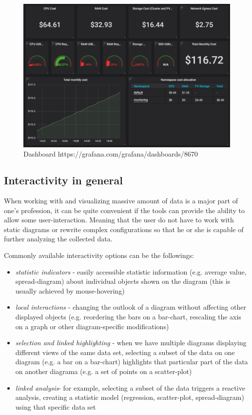 \begin{figure}[H]
	\centering
	\includegraphics[width=130mm, keepaspectratio]{figures/dashboard-small.png}
	\caption{Dashboard https://grafana.com/grafana/dashboards/8670}
	\label{fig:dashboard}
\end{figure}

\subsection{Interactivity in general}
When working with and visualizing massive amount of data is a major part of one's profession, it can be quite convenient if the tools can provide the ability to allow some user-interaction. Meaning that the user do not have to work with static diagrams or rewrite complex configurations so that he or she is capable of further analyzing the collected data.

Commonly available interactivity options can be the followings:
\begin{itemize}
	\item \emph{statistic indicators} - easily accessible statistic information (e.g. average value, spread-diagram) about individual objects shown on the diagram (this is usually achieved by mouse-hovering)
	\item \emph{local interactions} - changing the outlook of a diagram without affecting other displayed objects (e.g. reordering the bars on a bar-chart, rescaling the axis on a graph or other diagram-specific modifications)
	\item \emph{selection and linked highlighting} - when we have multiple diagrams displaying different views of the same data set, selecting a subset of the data on one diagram (e.g. a bar on a bar-chart) highlights that particular part of the data on another diagrama (e.g. a set of points on a scatter-plot)
	\item \emph{linked analysis}- for example, selecting a subset of the data triggers a reactive analysis, creating a statistic model (regression, scatter-plot, spread-diagram) using that specific data set
\end{itemize}

